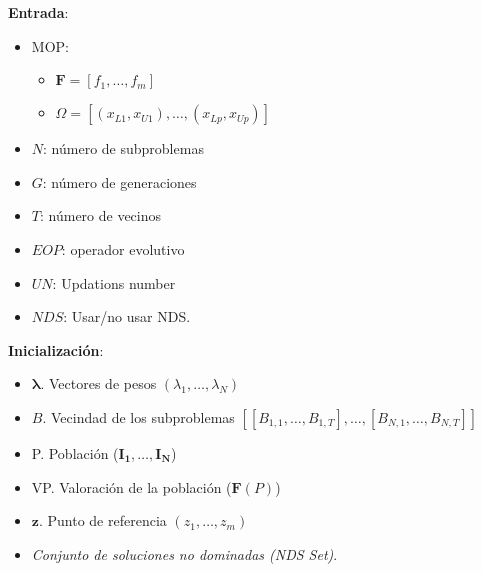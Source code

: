 \begin{minipage}[H]{0.47\linewidth}
    \begin{algorithm}[H]
\SetAlgoLined
 \textbf{Entrada}:
 \begin{itemize}
 
     \vspace{0.15cm}\item MOP: 
     \begin{itemize}
         \vspace{0.15cm}\item[] $\boldsymbol{F}=[f_1, \dots, f_m]$
         \vspace{0.15cm}\item[] $\Omega =[(x_{L1}, x_{U1}), \dots, (x_{Lp}, x_{Up})]$
     \end{itemize}
     
    \vspace{0.15cm}\item $N$: número de subproblemas
     
    \vspace{0.15cm}\item $G$: número de generaciones
     
    \vspace{0.15cm}\item $T$: número de vecinos

    \vspace{0.15cm}\item $EOP$: operador evolutivo

    \vspace{0.15cm}\item $UN$: Updations number

    \vspace{0.15cm}\item $NDS$: Usar/no usar NDS.

 \end{itemize}
 
 \vspace{0.3cm}
  
 \textbf{Inicialización}:
    \begin{itemize}
        \vspace{0.15cm}\item $\boldsymbol{\lambda}$. Vectores de pesos $(\lambda_1, \dots, \lambda_N)$
        \vspace{0.15cm}\item $B$. Vecindad de los subproblemas $[[B_{1,1}, \dots, B_{1,T}], \dots, [B_{N,1}, \dots, B_{N,T}] ]$
        \vspace{0.15cm}\item P. Población ($\boldsymbol{I_1}, \dots, \boldsymbol{I_N}$)
        \vspace{0.15cm}\item VP. Valoración de la población ($\boldsymbol{F}(P)$)
        \vspace{0.15cm}\item $\boldsymbol{z}$. Punto de referencia $(z_1, \dots, z_m)$
        \vspace{0.15cm}\item \textit{Conjunto de soluciones no dominadas (NDS Set)}. 
    \end{itemize}
    

\end{algorithm}
\end{minipage}
